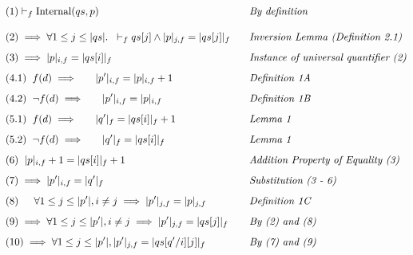 \documentclass{article}
\begin{document}
\begin{alignat*}{5}
&(1) \vdash_f \text{Internal}(qs, p) && \hspace{0.3cm} \textit{By definition}\\[10pt]
&(2) \implies \forall 1 \leq j \leq |qs|. \hspace{0.2cm} \vdash_f qs[j] \land |p|_{j, f} = |qs[j]|_f&& \hspace{0.3cm} \textit{Inversion Lemma (Definition 2.1)}\\[5pt]
&(3) \implies |p|_{i, f} = |qs[i]|_f&& \hspace{0.3cm} \textit{Instance of universal quantifier (2)}\\[5pt]
&(4.1)  \hspace{0.2cm} f(d) \implies \indent |p'|_{i, f} = |p|_{i, f} + 1&& \hspace{0.3cm} \textit{Definition 1A}\\[5pt]
&(4.2)  \hspace{0.2cm} \neg f(d) \implies \indent |p'|_{i, f} = |p|_{i, f} && \hspace{0.3cm} \textit{Definition 1B}\\[5pt]
&(5.1) \hspace{0.2cm} f(d) \implies \indent |q'|_f = |qs[i]|_f + 1&& \hspace{0.3cm} \textit{Lemma 1}\\[5pt]
&(5.2) \hspace{0.2cm}  \neg f(d) \implies \indent |q'|_f = |qs[i]|_f && \hspace{0.3cm} \textit{Lemma 1}\\[5pt]
&(6) \hspace{0.2cm} |p|_{i, f} + 1 = |qs[i]|_f + 1&& \hspace{0.3cm} \textit{Addition Property of Equality (3)}\\[5pt]
&(7) \implies |p'|_{i, f} = |q'|_f && \hspace{0.3cm} \textit{Substitution (3 - 6)}\\[5pt]
&(8) \indent \forall 1 \leq j \leq |p'|, i \neq j \implies |p'|_{j, f} = |p|_{j, f}&& \hspace{0.3cm} \textit{Definition 1C}\\[5pt]
&(9) \implies \forall 1 \leq j \leq |p'|, i \neq j \implies |p'|_{j, f} = |qs[j]|_f&& \hspace{0.3cm} \textit{By (2) and (8)}\\[5pt]
&(10) \implies \forall 1 \leq j \leq |p'|, |p'|_{j, f} = |qs[q' / i][j]|_f&& \hspace{0.3cm} \textit{By (7) and (9)}\\[5pt]

\end{alignat*}
\end{document}
